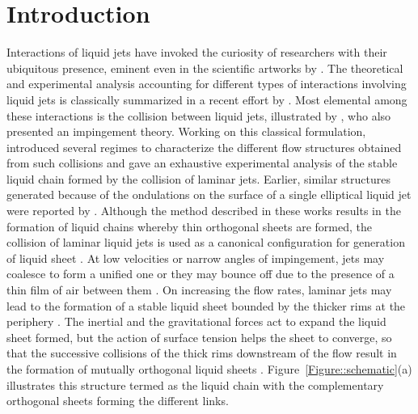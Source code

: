 \documentclass[%
 aip,
 sd,%
amsmath,amssymb,
preprint,%
author-year,%
]{revtex4-1}
\begin{document}
\section{Introduction}
Interactions of liquid jets have invoked the curiosity of researchers with their ubiquitous presence, eminent even in the scientific artworks by \cite{da1954notebooks}. The {\color{red}theoretical and experimental analysis accounting for} different types of interactions involving liquid jets is classically summarized in a recent effort by \cite{eggers2008physics}. Most elemental among these interactions is the collision between liquid jets, illustrated by \cite{taylor1960formation}, who also presented an impingement theory. Working on this classical formulation, \cite{bush2004collision} introduced several regimes to characterize the different flow structures obtained from such collisions and gave an exhaustive experimental analysis of the stable liquid chain formed by the collision of laminar jets. Earlier, similar structures generated because of the ondulations on the surface of a single elliptical liquid jet were reported by \cite{rayleigh1879capillary,rayleigh1889tension}. Although the method described in these works results in the formation of liquid chains whereby thin orthogonal sheets are formed, the collision of laminar liquid jets is used as a canonical configuration for generation of liquid sheet \citep{bush2004collision}. At low velocities or narrow angles of impingement, jets may coalesce to form a unified one or they may bounce off due to the presence of a thin film of air between them \citep{wadhwa2013noncoalescence}. On increasing the flow rates, laminar jets may lead to the formation of a stable liquid sheet bounded by the thicker rims at the periphery \citep{yang2014liquid}. The inertial and the gravitational forces act to expand the liquid sheet formed, but the action of surface tension {\color{red}helps} the sheet to converge, {\color{red}so} that the successive collisions of the thick rims downstream of the flow result in the formation of mutually orthogonal liquid sheets \citep{bush2004collision}. Figure~\ref{Figure::schematic}(a) illustrates this structure termed as the liquid chain with the complementary orthogonal sheets forming the different links.\\
\end{document}
